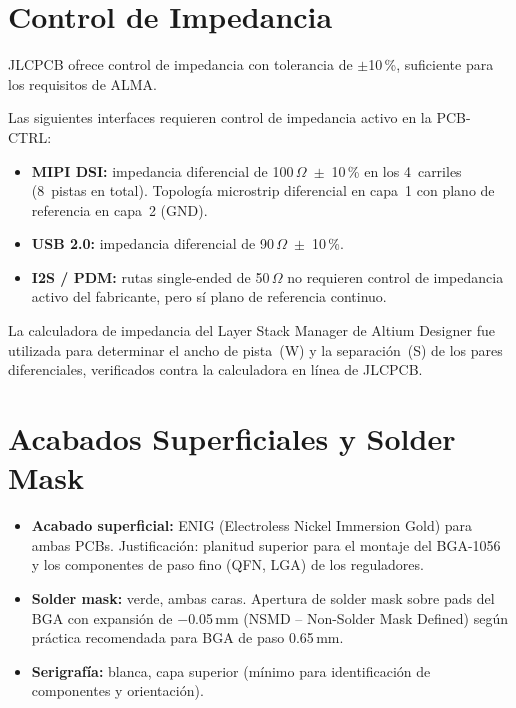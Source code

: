 \section{Control de Impedancia}
\label{sec:fab_impedancia}

JLCPCB ofrece control de impedancia con tolerancia de $\pm$10\,\%, suficiente para
los requisitos de ALMA.

\begin{fabbox}
  Las siguientes interfaces requieren control de impedancia activo en la PCB-CTRL:
  \begin{itemize}
    \item \textbf{MIPI DSI:} impedancia diferencial de 100\,$\Omega$~$\pm$~10\,\%
      en los 4~carriles (8~pistas en total). Topología microstrip diferencial en
      capa~1 con plano de referencia en capa~2 (GND).
    \item \textbf{USB 2.0:} impedancia diferencial de 90\,$\Omega$~$\pm$~10\,\%.
    \item \textbf{I2S / PDM:} rutas single-ended de 50\,$\Omega$ no requieren
      control de impedancia activo del fabricante, pero sí plano de referencia
      continuo.
  \end{itemize}
  La calculadora de impedancia del Layer Stack Manager de Altium Designer fue
  utilizada para determinar el ancho de pista~(W) y la separación~(S) de los pares
  diferenciales, verificados contra la calculadora en línea de JLCPCB.
\end{fabbox}

\section{Acabados Superficiales y Solder Mask}
\label{sec:fab_acabados}

\begin{itemize}
  \item \textbf{Acabado superficial:} ENIG (Electroless Nickel Immersion Gold)
    para ambas PCBs. Justificación: planitud superior para el montaje del BGA-1056
    y los componentes de paso fino (QFN, LGA) de los reguladores.
  \item \textbf{Solder mask:} verde, ambas caras. Apertura de solder mask sobre
    pads del BGA con expansión de $-$0.05\,mm (NSMD -- Non-Solder Mask Defined)
    según práctica recomendada para BGA de paso 0.65\,mm.
  \item \textbf{Serigrafía:} blanca, capa superior (mínimo para identificación de
    componentes y orientación).
\end{itemize}

